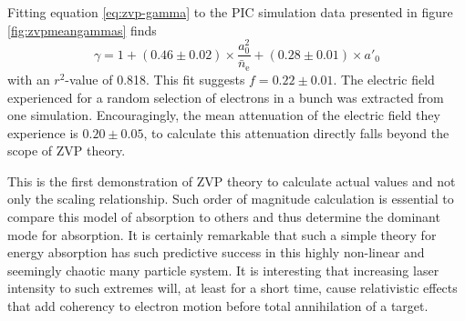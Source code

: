 Fitting equation \ref{eq:zvp-gamma} to the PIC simulation data presented in figure \ref{fig:zvpmeangammas} finds
\begin{equation}
	\gamma = 1 + (0.46\pm 0.02)\times \frac{a^2_0}{\bar{n}_\mathrm{e}} + (0.28\pm 0.01)\times a'_0
\end{equation}
with an $r^2$-value of 0.818. This fit suggests $f = 0.22\pm 0.01$. The electric field experienced for a random selection of electrons in a bunch was extracted from one simulation. Encouragingly, the mean attenuation of the electric field they experience is $0.20\pm0.05$, to calculate this attenuation directly falls beyond the scope of ZVP theory.

This is the first demonstration of ZVP theory to calculate actual values and not only the scaling relationship. Such order of magnitude calculation is essential to compare this model of absorption to others and thus determine the dominant mode for absorption. It is certainly remarkable that such a simple theory for energy absorption has such predictive success in this highly non-linear and seemingly chaotic many particle system. It is interesting that increasing laser intensity to such extremes will, at least for a short time, cause relativistic effects that add coherency to electron motion before total annihilation of a target.

